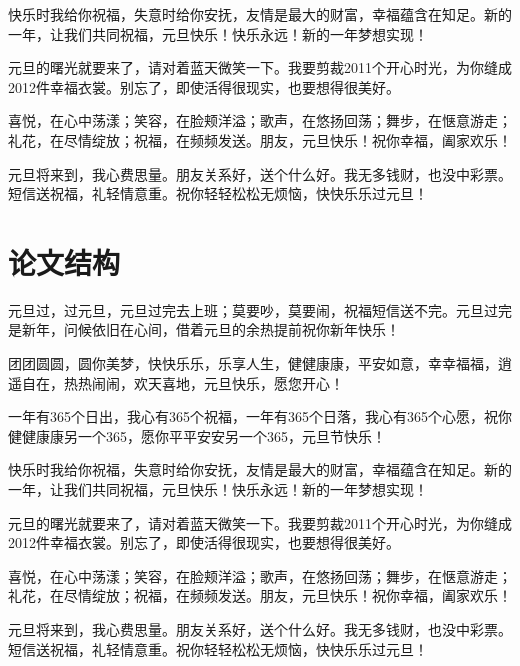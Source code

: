 快乐时我给你祝福，失意时给你安抚，友情是最大的财富，幸福蕴含在知足。新的一年，让我们共同祝福，元旦快乐！快乐永远！新的一年梦想实现！

元旦的曙光就要来了，请对着蓝天微笑一下。我要剪裁2011个开心时光，为你缝成2012件幸福衣裳。别忘了，即使活得很现实，也要想得很美好。

喜悦，在心中荡漾；笑容，在脸颊洋溢；歌声，在悠扬回荡；舞步，在惬意游走；礼花，在尽情绽放；祝福，在频频发送。朋友，元旦快乐！祝你幸福，阖家欢乐！

元旦将来到，我心费思量。朋友关系好，送个什么好。我无多钱财，也没中彩票。短信送祝福，礼轻情意重。祝你轻轻松松无烦恼，快快乐乐过元旦！

\section{论文结构}

元旦过，过元旦，元旦过完去上班；莫要吵，莫要闹，祝福短信送不完。元旦过完是新年，问候依旧在心间，借着元旦的余热提前祝你新年快乐！

团团圆圆，圆你美梦，快快乐乐，乐享人生，健健康康，平安如意，幸幸福福，逍遥自在，热热闹闹，欢天喜地，元旦快乐，愿您开心！

一年有365个日出，我心有365个祝福，一年有365个日落，我心有365个心愿，祝你健健康康另一个365，愿你平平安安另一个365，元旦节快乐！

快乐时我给你祝福，失意时给你安抚，友情是最大的财富，幸福蕴含在知足。新的一年，让我们共同祝福，元旦快乐！快乐永远！新的一年梦想实现！

元旦的曙光就要来了，请对着蓝天微笑一下。我要剪裁2011个开心时光，为你缝成2012件幸福衣裳。别忘了，即使活得很现实，也要想得很美好。

喜悦，在心中荡漾；笑容，在脸颊洋溢；歌声，在悠扬回荡；舞步，在惬意游走；礼花，在尽情绽放；祝福，在频频发送。朋友，元旦快乐！祝你幸福，阖家欢乐！

元旦将来到，我心费思量。朋友关系好，送个什么好。我无多钱财，也没中彩票。短信送祝福，礼轻情意重。祝你轻轻松松无烦恼，快快乐乐过元旦！




